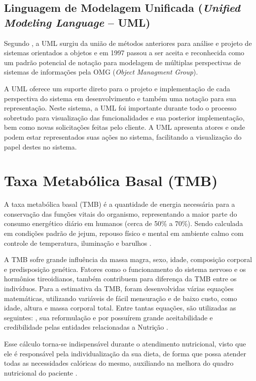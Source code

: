\documentclass[
	12pt,				%
    oneside,			%
	a4paper,			%
	english,			%
	french,				%
	spanish,			%
	brazil,				%
	]{abntex2}
\begin{document}
\subsection{Linguagem de Modelagem Unificada (\textit{Unified Modeling Language} – UML)}

Segundo , a UML surgiu da união de métodos anteriores para
análise e projeto de sistemas orientados a objetos e em 1997 passou a ser aceita e
reconhecida como um padrão potencial de notação para modelagem de múltiplas
perspectivas de sistemas de informações pela OMG (\textit{Object Managment Group}). 

A UML oferece um suporte direto para o projeto e
implementação de cada perspectiva do sistema em desenvolvimento e também uma
notação para sua representação. Neste sistema, a UML foi importante durante todo o
processo sobretudo para visualização das funcionalidades e sua posterior 
implementação, bem como novas solicitações feitas pelo cliente. A UML apresenta
atores e onde podem estar representados suas ações no sistema, facilitando a
visualização do papel destes no sistema.

\section{Taxa Metabólica Basal (TMB)}

A taxa metabólica basal (TMB) é a quantidade de energia necessária para a
conservação das funções vitais do organismo, representando a maior parte do
consumo energético diário em humanos (cerca de 50\% a 70\%). Sendo calculada em
condições padrão de jejum, repouso físico e mental em ambiente calmo com controle
de temperatura, iluminação e barulhos \cite{ruiz} \cite{harris1}.

A TMB sofre grande influência da massa magra, sexo, idade, composição
corporal e predisposição genética. Fatores como o funcionamento do sistema nervoso
e os hormônios tireoidianos, também contribuem para diferença da TMB entre os
indivíduos. Para a estimativa da TMB, foram desenvolvidas várias equações
matemáticas, utilizando variáveis de fácil mensuração e de baixo custo, como idade,
altura e massa corporal total. Entre tantas equações, são utilizadas as seguintes:
, sua reformulação  e  por possuírem grande
aceitabilidade e credibilidade pelas entidades relacionadas a Nutrição \cite{weijs}.

Esse cálculo torna-se indispensável durante o atendimento nutricional, visto
que ele é responsável pela individualização da sua dieta, de forma que possa atender
todas as necessidades calóricas do mesmo, auxiliando na melhora do quadro
nutricional do paciente \cite{pedrosa}.
\end{document}
